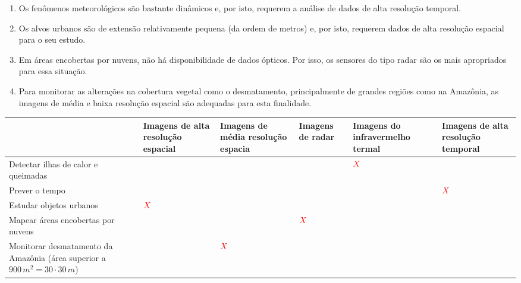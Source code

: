 \documentclass[a4paper, 12pt]{article}
\newcommand{\red}[1]{\textcolor{red}{#1}}
\begin{document}
\begin{flushleft}
\begin{itemize}
\begin{itemize}
{\begin{enumerate}
                            \item Os  fenômenos  meteorológicos  são  bastante  dinâmicos  e,  por  isto,  requerem  a  análise  de  dados  de  alta resolução temporal.
                            \item Os alvos urbanos são de extensão relativamente pequena (da ordem de metros) e, por isto, requerem dados de alta resolução espacial para o seu estudo.
                            \item Em  áreas  encobertas  por  nuvens,  não  há  disponibilidade de dados ópticos.  Por isso, os sensores do tipo radar são os mais apropriados para essa situação.
                            \item Para monitorar as alterações na cobertura vegetal como o desmatamento, principalmente de grandes regiões como na Amazônia, as imagens de média e baixa resolução espacial são adequadas para esta finalidade.
                        \end{enumerate}}
                        \begin{center} \begin{tabular}
                        {
                            |M{0.2\textwidth}|M{0.1\textwidth}|M{0.1\textwidth}|M{0.1\textwidth}|M{0.1\textwidth}|M{0.1\textwidth}|
                        }
                            \hline
                            $\quad$ & Imagens de alta resolução espacial & Imagens de média resolução espacia & Imagens de radar & Imagens do infravermelho termal & Imagens de alta resolução temporal \\ \hline
                            Detectar ilhas de calor e queimadas & $\quad$ & $\quad$ & $\quad$ & $\red{X}$ & $\quad$ \\ \hline
                            Prever o tempo & $\quad$ & $\quad$ & $\quad$ & $\quad$ & $\red{X}$ \\ \hline
                            Estudar objetos urbanos & $\red{X}$ & $\quad$ & $\quad$ & $\quad$ & $\quad$ \\ \hline
                            Mapear áreas encobertas por nuvens & $\quad$ & $\quad$ & $\red{X}$ & $\quad$ & $\quad$ \\ \hline
                            Monitorar desmatamento da Amazônia (área superior a $900 \, m^2 = 30 \cdot  30 \, m$) & $\quad$ & $\red{X}$ & $\quad$ & $\quad$ & $\quad$ \\ \hline
                        \end{tabular} \end{center}
                \end{itemize}


\end{itemize}
\end{flushleft}
\end{document}

